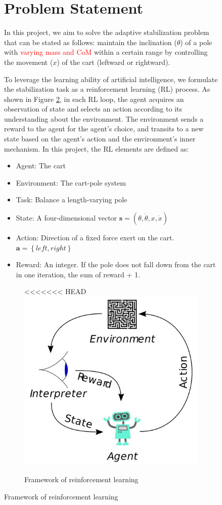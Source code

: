 \documentclass[10pt,a4paper]{article}
\begin{document}
\begin{figure}[H]
	\section{Problem Statement}
	In this project, we aim to solve the adaptive stabilization problem that can be stated as follows: maintain the inclination ($\theta$) of a pole with \textcolor{red}{varying mass and CoM} within a certain range by controlling the movement ($x$) of the cart (leftward or rightward).
	
	To leverage the learning ability of artificial intelligence, we formulate the stabilization task as a reinforcement learning (RL) process. As shown in Figure \ref{fig:rl}, in each RL loop, the agent acquires an observation of state and selects an action according to its understanding about the environment. The environment sends a reward to  the agent for the agent's choice, and transits to a new state based on the agent's action and the environment's inner mechanism. In this project, the RL elements are defined as:
	
	\begin{itemize}
		\item Agent: The cart
		\item Environment: The cart-pole system
		\item Task: Balance a length-varying pole
		\item State: A four-dimensional vector $\boldsymbol{s} = (\theta, \dot{\theta}, x, \dot{x})$
		\item Action: Direction of a fixed force exert on the cart. $\boldsymbol{a} = \left\{ left, right\right\}$
		\item Reward: An integer. If the pole does not fall down from the cart in one iteration, the sum of reward + 1. 
	\end{itemize}
	
	
	
	
	\begin{figure}
		\centering
<<<<<<< HEAD
		\includegraphics[width=0.3\linewidth]{figure/rl}
		\caption{Framework of reinforcement learning}
		\label{fig:rl}
	\end{figure}
	

\end{figure}
\end{document}
